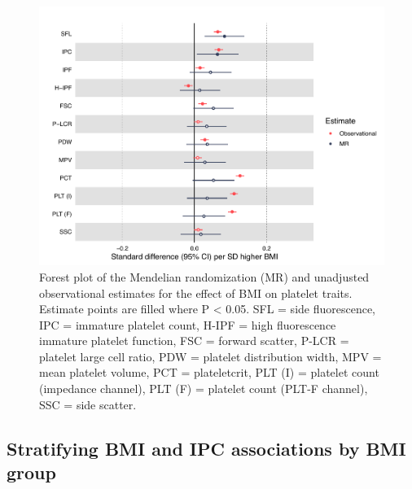 \documentclass[11pt,twoside]{bristolthesis}
\begin{document}
\begin{figure}
\includegraphics[width=0.9\linewidth]{figure/BMI_platelets/BMI_platelet_forestplot} \caption[Forest plot of the Mendelian randomization and unadjusted observational estimates for the effect of BMI on platelet traits.]{Forest plot of the Mendelian randomization (MR) and unadjusted observational estimates for the effect of BMI on platelet traits. Estimate points are filled where P < 0.05. SFL = side fluorescence, IPC = immature platelet count, H-IPF = high fluorescence immature platelet function, FSC = forward scatter, P-LCR = platelet large cell ratio, PDW = platelet distribution width, MPV = mean platelet volume, PCT = plateletcrit, PLT (I) = platelet count (impedance channel), PLT (F) = platelet count (PLT-F channel), SSC = side scatter.}\label{fig:BMI-platelet-forest}
\end{figure}
\hypertarget{stratifying-bmi-and-ipc-associations-by-bmi-group}{%
\subsection{Stratifying BMI and IPC associations by BMI group}\label{stratifying-bmi-and-ipc-associations-by-bmi-group}}
\end{document}
